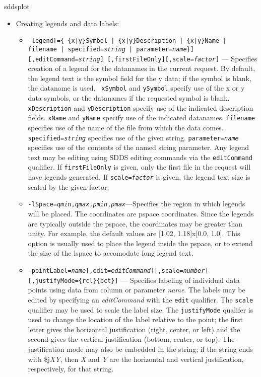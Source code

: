 \begin{sddsprog}{sddsplot}
\begin{itemize}
\begin{itemize}
  \end{itemize}
\item Creating legends and data labels:
  \begin{itemize}

  \item {\tt -legend[=\{ \{x|y\}Symbol | \{x|y\}Description | \{x|y\}Name | filename | 
 specified={\em string} | parameter={\em name}\}] [,editCommand={\em string}]
  [,firstFileOnly][,scale={\em factor}]} \rm
--- Specifies creation of a legend for the datanames in the current request.  By default, the
legend text is the symbol field for the y data; if the symbol is blank, the dataname is used.  {\tt
xSymbol} and {\tt ySymbol} specify use of the x or y data symbols, or the datanames if the requested
symbol is blank.  {\tt xDescription} and {\tt yDescription} specify use of the indicated description
fields.  {\tt xName} and {\tt yName} specify use of the indicated datanames.  {\tt filename}
specifies use of the name of the file from which the data comes.  {\tt specified={\em string}}
specifies use of the given string.  {\tt parameter={\em name}} specifies use of the contents of the
named string parameter.  Any legend text may be editing using SDDS editing commands via the {\tt editCommand} qualifier.  If {\tt firstFileOnly} is given, only the first file
in the request will have legends generated.  If {\tt scale={\em factor}} is given, the legend text
size is scaled by the given factor.

  \item {\tt -lSpace={\em qmin},{\em qmax},{\em pmin},{\em pmax}}---Specifies the region in which
legends will be placed.  The coordinates are pspace coordinates.  Since the legends are typically
outside the pspace, the coordinates may be greater than unity.  For example, the default values are
[1.02, 1.18]x[0.0, 1.0].  This option is usually used to place the legend inside the pspace, or to
extend the size of the lspace to accomodate long legend text.

  \item {\tt -pointLabel={\em name}[,edit={\em editCommand}][,scale={\em number}]
        [,justifyMode=\{rcl\}\{bct\}]} --- Specifies labeling of individual data points using
        data from column or parameter {\em name}.  The labels may be edited by specifying an
        {\em editCommand} with the {\tt edit} qualifier.  The {\tt scale} qualifier may be
        used to scale the label size.  The {\tt justifyMode} qualifer is used to change the
        location of the label relative to the point; the first letter gives the horizontal
        justification (right, center, or left) and the second gives the vertical
        justification (bottom, center, or top). The justification mode may also be embedded  in
        the string; if the string ends with \$j{\em XY}, then {\em X} and {\em Y} are the
        horizontal and vertical justification, respectively, for that string.
        

\end{itemize}
\end{itemize}
\end{sddsprog}
